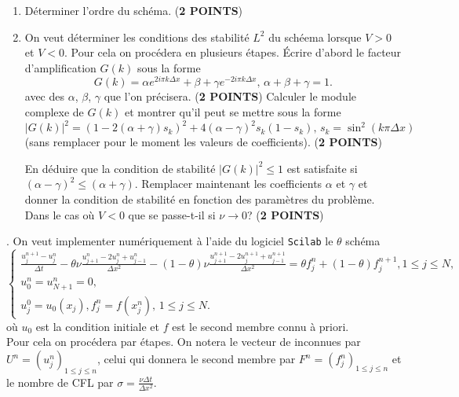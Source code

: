 \documentclass[12pt,a4paper]{article}
\begin{document}
\begin{enumerate}
\item D\'eterminer l'ordre du sch\'ema. ({\bf 2 POINTS})
\vspace{9cm}
\item On veut d\'eterminer les conditions des stabilit\'e $L^2$ du sch\'eema lorsque $V > 0$ et
$V < 0$. Pour cela on proc\'edera en plusieurs \'etapes. \'Ecrire
d'abord le facteur d'amplification $G(k)$ sous la forme
$$
G(k)=\alpha e^{2i\pi k\Delta x}+\beta +\gamma  e^{-2i\pi k\Delta x},\, \alpha+\beta+\gamma=1.
$$
avec des $\alpha$, $\beta$, $\gamma$ que l'on pr\'ecisera. ({\bf 2 POINTS})
\newpage
\noindent Calculer le module complexe de $G(k)$ et montrer qu'il peut se mettre
sous la forme
$$
|G(k)|^2=(1-2(\alpha+\gamma)s_k)^2+4(\alpha-\gamma)^2s_k(1-s_k),\, s_k=\sin^2(k\pi\Delta x)
$$
(sans remplacer pour le moment les valeurs de coefficients).  ({\bf 2 POINTS})
\vspace{8cm}

\noindent En d\'eduire que la condition de stabilit\'e
$|G(k)|^2 \le 1$ est satisfaite si $(\alpha-\gamma)^2\le (\alpha+\gamma)$.
Remplacer maintenant les coefficients $\alpha$ et $\gamma$ et donner
la condition de stabilit\'e en fonction des param\`etres du
probl\`eme. Dans le cas o\`u $V < 0$ que se passe-t-il si $\nu\rightarrow 0$? ({\bf 2 POINTS})
\end{enumerate}
\vspace{8cm}
. On veut implementer num\'eriquement \`a
l'aide du logiciel \texttt{Scilab} le {$\theta$ sch\'ema}
$$
\left\{\begin{array}{l}
\displaystyle\frac{u_j^{n+1}-u_j^n}{\Delta t}-\theta\nu
\frac{u_{j+1}^{n}-2u_j^n+u_{j-1}^{n}}{\Delta x^2}-(1-\theta)\nu
\frac{u_{j+1}^{n+1}-2u_j^{n+1}+u_{j-1}^{n+1}}{\Delta x^2}=\theta f^n_j+(1-\theta)f^{n+1}_j, 1\le j
\le N,\\[2ex]
\displaystyle u^n_0=u^n_{N+1}=0,\, \\
u_j^0=u_0(x_j), f^n_j = f(x_j^n),\, 1\le j \le N.
\end{array}\right.
$$
o\`u $u_0$ est la condition initiale et $f$ est le second membre connu
\`a priori.  \\
Pour cela on proc\'edera par \'etapes. On notera le vecteur de
inconnues par $U^n=(u^n_j)_{1\le
  j\le n}$, celui qui donnera le second membre par $F^n=(f^n_j)_{1\le
  j\le n}$ et le nombre de CFL par $\sigma=\frac{\nu\Delta t}{\Delta x^2}$.
\end{document}
